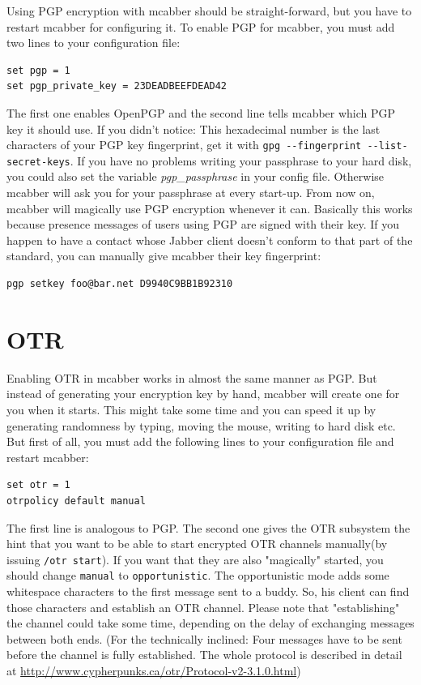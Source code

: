 \documentclass[12pt,oneside,a4]{book}
\begin{document}
Using PGP encryption with mcabber should be straight-forward, but you have to
restart mcabber for configuring it. To enable PGP for mcabber, you must
add two lines to your configuration file:
\begin{lstlisting}
set pgp = 1
set pgp_private_key = 23DEADBEEFDEAD42
\end{lstlisting}
The first one enables OpenPGP and the second line tells mcabber which PGP key it
should use. If you didn't notice: This hexadecimal number is the last
characters of your PGP key fingerprint, get it with
\verb+gpg --fingerprint+\verb+ --list-secret-keys+.
If you have no problems writing your passphrase to your hard disk, you could
also set the variable \textit{pgp\_passphrase} in your config file. Otherwise mcabber will
ask you for your passphrase at every start-up.
From now on, mcabber will magically use PGP encryption whenever it can.
Basically this works because presence messages of users using PGP are signed
with their key. If you happen to have a contact whose Jabber client doesn't
conform to that part of the standard, you can manually give mcabber their key
fingerprint:
\begin{lstlisting}
pgp setkey foo@bar.net D9940C9BB1B92310
\end{lstlisting}
\section{OTR}
Enabling OTR in mcabber works in almost the same manner as PGP. But instead of
generating your encryption key by hand, mcabber will create one for you when
it starts. This might take some time and you can speed it up by generating
randomness by typing, moving the mouse, writing to hard disk etc.
But first of all, you must add the following lines to your configuration file
and restart mcabber:
\begin{lstlisting}
set otr = 1
otrpolicy default manual
\end{lstlisting}
The first line is analogous to PGP. The second one gives the OTR subsystem
the hint that you want to be able to start encrypted OTR channels
manually(by issuing \verb+/otr start+). If you want that they are also "magically" started, you should
change \verb+manual+ to \verb+opportunistic+. The opportunistic mode adds some whitespace
characters to the first message sent to a buddy. So, his client can find those
characters and establish an OTR channel. Please note that "establishing" the
channel could take some time, depending on the delay of exchanging messages
between both ends. (For the technically inclined: Four messages have to be sent
before the channel is fully established. The whole protocol is described in
detail at \url{http://www.cypherpunks.ca/otr/Protocol-v2-3.1.0.html})
\end{document}
